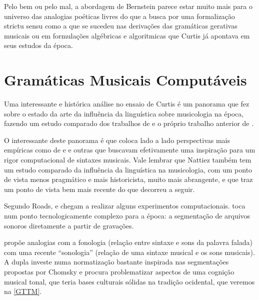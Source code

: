 \documentclass[
	12pt,				%
	openright,			%
	twoside,			%
	a4paper,			%
	english,			%
	french,				%
	spanish,			%
	brazil				%
	]{abntex2}
\begin{document}
Pelo bem ou pelo mal, a abordagem de Bernstein parece estar muito mais para o universo das analogias poéticas livres do que a busca por uma formalização strictu sensu \cite{lerdahl2009genesis} como a que se sucedeu nas derivações das gramáticas gerativas musicais \cite{lerdahl1983generative,temperley2004cognition} ou em formulações algébricas e algoritmicas que Curtis  já apontava em seus estudos da época.

 

\section{Gramáticas Musicais Computáveis}

Uma interessante e histórica análise no ensaio de Curtis  é um panorama que fez sobre o estado da arte da influência da linguística sobre musicologia na época, fazendo um estudo comparado dos trabalhos de  e o próprio trabalho anterior de .


O interessante deste panorama é que coloca lado a lado perspectivas mais empíricas como de  e  e outras que buscavam efetivamente uma inspiração para um rigor computacional de sintaxes musicais. Vale lembrar que Nattiez também tem um estudo comparado da influência da linguística na musicologia, com um ponto de vista menos pragmático e mais historicista, muito mais abrangente, e que traz um ponto de vista bem mais recente \cite{nattiez2004modelos} do que decorreu a seguir.


Segundo Roads,  e  chegam a realizar alguns experimentos computacionais.  toca num ponto tecnologicamente complexo para a época: a segmentação de arquivos sonoros diretamente a partir de gravações. 

 propõe analogias com a fonologia (relação entre sintaxe e sons da palavra falada) com uma recente “sonologia” (relação de uma sintaxe musical e os sons musicais). A dupla  investe numa normatização bastante inspirada nas segmentações propostas por Chomsky e procura problematizar aspectos de uma cognição musical tonal, que teria bases culturais sólidas na tradição ocidental, que veremos na \autoref{GTTM}.
\end{document}
